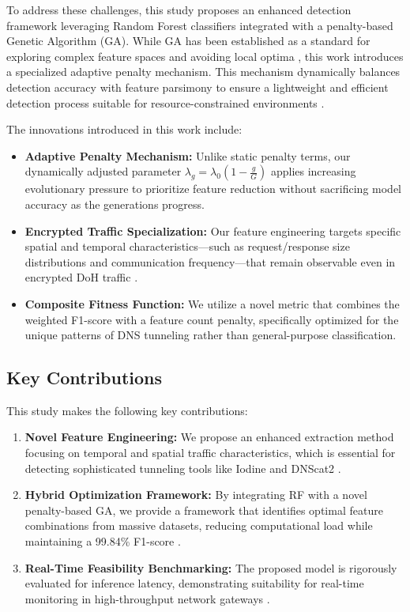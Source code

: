 \documentclass[journal]{IAENGtran}
\begin{document}
To address these challenges, this study proposes an enhanced detection framework leveraging Random Forest classifiers integrated with a penalty-based Genetic Algorithm (GA). While GA has been established as a standard for exploring complex feature spaces and avoiding local optima \cite{alemu2025genetic}, this work introduces a specialized adaptive penalty mechanism. This mechanism dynamically balances detection accuracy with feature parsimony to ensure a lightweight and efficient detection process suitable for resource-constrained environments \cite{liu2025intrusion}.

The innovations introduced in this work include:
\begin{itemize}
    \item \textbf{Adaptive Penalty Mechanism:} Unlike static penalty terms, our dynamically adjusted parameter $\lambda_g = \lambda_0(1-\frac{g}{G})$ applies increasing evolutionary pressure to prioritize feature reduction without sacrificing model accuracy as the generations progress.
    
    \item \textbf{Encrypted Traffic Specialization:} Our feature engineering targets specific spatial and temporal characteristics—such as request/response size distributions and communication frequency—that remain observable even in encrypted DoH traffic \cite{gursoy2024dns}.
    
    \item \textbf{Composite Fitness Function:} We utilize a novel metric that combines the weighted F1-score with a feature count penalty, specifically optimized for the unique patterns of DNS tunneling rather than general-purpose classification.
\end{itemize}

\subsection{Key Contributions}

This study makes the following key contributions:

\begin{enumerate}
    \item \textbf{Novel Feature Engineering:} We propose an enhanced extraction method focusing on temporal and spatial traffic characteristics, which is essential for detecting sophisticated tunneling tools like Iodine and DNScat2 \cite{casanova2023malicious}.
    
    \item \textbf{Hybrid Optimization Framework:} By integrating RF with a novel penalty-based GA, we provide a framework that identifies optimal feature combinations from massive datasets, reducing computational load while maintaining a 99.84\% F1-score \cite{singh2025optimizing, bozkurt2024new}.
    
    \item \textbf{Real-Time Feasibility Benchmarking:} The proposed model is rigorously evaluated for inference latency, demonstrating suitability for real-time monitoring in high-throughput network gateways \cite{akem2025real, liu2025intrusion}.
\end{enumerate}
\end{document}

